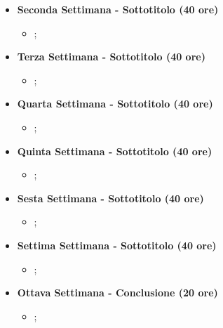 {\begin{itemize}
\begin{itemize}
        \end{itemize}
        \item \textbf{Seconda Settimana - Sottotitolo (40 ore)}
        \begin{itemize}
            \item ;
        \end{itemize}
        \item \textbf{Terza Settimana - Sottotitolo (40 ore)}
        \begin{itemize}
            \item ;
        \end{itemize}
        \item \textbf{Quarta Settimana - Sottotitolo (40 ore)}
        \begin{itemize}
            \item ;
        \end{itemize}
        \item \textbf{Quinta Settimana - Sottotitolo (40 ore)}
        \begin{itemize}
            \item ;
        \end{itemize}
        \item \textbf{Sesta Settimana - Sottotitolo (40 ore)}
        \begin{itemize}
            \item ;
        \end{itemize}
        \item \textbf{Settima Settimana - Sottotitolo (40 ore)}
        \begin{itemize}
            \item ;
        \end{itemize}
        \item \textbf{Ottava Settimana - Conclusione (20 ore)}
        \begin{itemize}
            \item ;
        \end{itemize}
    \end{itemize}
}

\newcommand{\totaleOre}{}

\newcommand{\obiettiviObbligatori}{
	 \item \underline{\textit{O01}}: primo obiettivo;
	 \item \underline{\textit{O02}}: secondo obiettivo;
	 \item \underline{\textit{O03}}: terzo obiettivo;

}

\newcommand{\obiettiviDesiderabili}{
	 \item \underline{\textit{D01}}: primo obiettivo;
	 \item \underline{\textit{D02}}: secondo obiettivo;
}

\newcommand{\obiettiviFacoltativi}{
	 \item \underline{\textit{F01}}: primo obiettivo;
	 \item \underline{\textit{F02}}: secondo obiettivo;
	 \item \underline{\textit{F03}}: terzo obiettivo;
}
